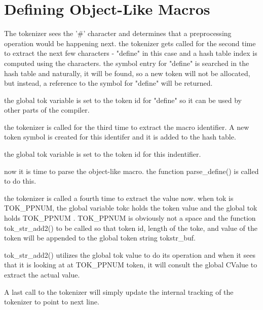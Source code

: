 \section{Defining Object-Like Macros}

The tokenizer sees the '\#' character and determines that a preprocessing operation would be happening next. the tokenizer gets called for the second time to extract the next few characters - "define" in this case and a hash table
index is computed using the characters. the symbol entry for "define" is searched in the hash table and naturally, it will be found, so a new token will not be allocated, but instead, a reference to the symbol for "define" will be returned.

the global tok variable is set to the token id for "define" so it can be used by other parts of the compiler.

the tokenizer is called for the third time to extract the macro identifier. A new token symbol is created for this identifer and it is added to the hash table.

the global tok variable is set to the token id for this indentifier.

now it is time to parse the object-like macro. the function parse\_define() is called to do this.

the tokenizer is called a fourth time to extract the value now. when tok is TOK\_PPNUM, the global variable tokc holds the token value and the global tok holds TOK\_PPNUM . TOK\_PPNUM is obviously not a space and the function tok\_str\_add2() to be called so that token id, length of the toke, and value of the token will be appended to the global token string tokstr\_buf.

tok\_str\_add2() utilizes the global tok value to do its operation and when it sees that it is looking at at TOK\_PPNUM token, it will consult the global CValue to extract the actual value.

A last call to the tokenizer will simply update the internal tracking of the tokenizer to point to next line.







